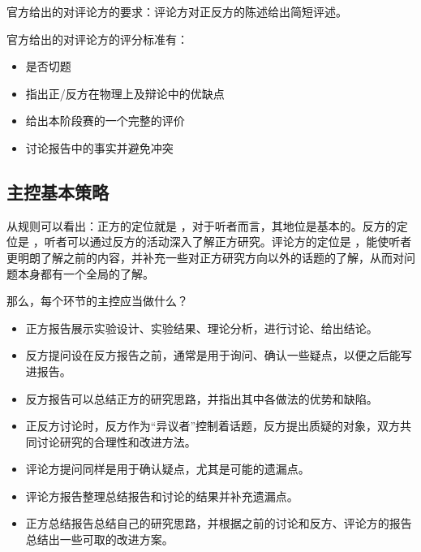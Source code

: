 \documentclass[a4paper,10pt,english]{sphinxmanual}
\begin{document}
官方给出的对评论方的要求：评论方对正反方的陈述给出简短评述。

官方给出的对评论方的评分标准有：
\begin{itemize}
\item {} 
是否切题

\item {} 
指出正/反方在物理上及辩论中的优缺点

\item {} 
给出本阶段赛的一个完整的评价

\item {} 
讨论报告中的事实并避免冲突

\end{itemize}


\subsection{主控基本策略}
\label{\detokenize{6. Tournament:id6}}
从规则可以看出：正方的定位就是  ，对于听者而言，其地位是基本的。反方的定位是  ，听者可以通过反方的活动深入了解正方研究。评论方的定位是  ，能使听者更明朗了解之前的内容，并补充一些对正方研究方向以外的话题的了解，从而对问题本身都有一个全局的了解。

那么，每个环节的主控应当做什么？
\begin{itemize}
\item {} 
正方报告展示实验设计、实验结果、理论分析，进行讨论、给出结论。

\item {} 
反方提问设在反方报告之前，通常是用于询问、确认一些疑点，以便之后能写进报告。

\item {} 
反方报告可以总结正方的研究思路，并指出其中各做法的优势和缺陷。

\item {} 
正反方讨论时，反方作为“异议者”控制着话题，反方提出质疑的对象，双方共同讨论研究的合理性和改进方法。

\item {} 
评论方提问同样是用于确认疑点，尤其是可能的遗漏点。

\item {} 
评论方报告整理总结报告和讨论的结果并补充遗漏点。

\item {} 
正方总结报告总结自己的研究思路，并根据之前的讨论和反方、评论方的报告总结出一些可取的改进方案。

\end{itemize}
\end{document}
